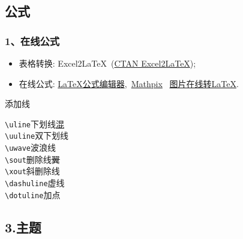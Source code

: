 \documentclass[12pt,aspectratio=169,mathserif]{beamer}
\begin{document}
\subsection{公式}
\begin{frame}
    \frametitle{1、在线公式}

    \begin{itemize}
        \item<2-> 表格转换: Excel2\LaTeX~(\href{https://www.ctan.org/tex-archive/support/excel2latex/}{CTAN Excel2\LaTeX});
        \item<2-> 在线公式: \href{https://www.latexlive.com/}{LaTeX公式编辑器},~\href{https://mathpix.com/}{Mathpix}~ \href{https://mathf.itewqq.cn/}{图片在线转LaTeX}.
    \end{itemize}

\end{frame}

\begin{frame}[fragile]{添加线}
	\begin{multicols}{2}
		\verb|\uline|\hfill 下划线\qquad\uline{混}\\
		\verb|\uuline|\hfill 双下划线\qquad{}\\
		\verb|\uwave|\hfill 波浪线\qquad{}\\
		\verb|\sout|\hfill 删除线\qquad\sout{翼}\\
		\verb|\xout|\hfill 斜删除线\qquad{}\\
		\verb|\dashuline|\hfill 虚线\qquad{}\\
		\verb|\dotuline|\hfill 加点\qquad{}
	\end{multicols}
\end{frame}

\subsection{3.主题}
\end{document}
